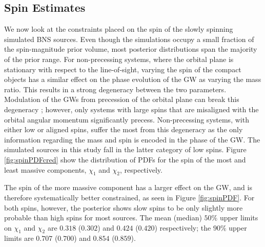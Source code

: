 \subsection{Spin Estimates}\label{sec:spin-magnitudes}
We now look at the constraints placed on the spin of the slowly spinning simulated BNS sources.  Even though the simulations occupy a small fraction of the spin-magnitude prior volume, most posterior distributions span the majority of the prior range. For non-precessing systems, where the orbital plane is stationary with respect to the line-of-sight, varying the spin of the compact objects has a similar effect on the phase evolution of the GW as varying the mass ratio. This results in a strong degeneracy between the two parameters.  Modulation of the GWs from precession of the orbital plane can break this degeneracy \citep{Vecchio_2004,Lang_2006,Vitale_2014,Chatziioannou_2014}; however, only systems with large spins that are misaligned with the orbital angular momentum significantly precess. Non-precessing systems, with either low or aligned spins, suffer the most from this degeneracy as the only information regarding the mass and spin is encoded in the phase of the GW.  The simulated sources in this study fall in the latter category of low spins.  Figure  \ref{fig:spinPDFcred} show the distribution of PDFs for the spin of the most and least massive components, $\chi_1$ and $\chi_2$, respectively.

The spin of the more massive component has a larger effect on the GW, and is therefore systematically better constrained, as seen in Figure \ref{fig:spinPDF}.  For both spins, however, the posterior shows slow spins to be only slightly more probable than high spins for most sources. The mean (median) $50\%$ upper limits on $\chi_1$ and $\chi_2$ are $0.318$ ($0.302$) and $0.424$ ($0.420$) respectively; the $90\%$ upper limits are $0.707$ ($0.700$) and $0.854$ ($0.859$).
  
  
  
  
  
  
  
  
  